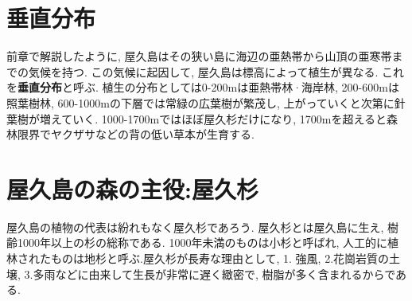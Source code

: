 \documentclass[10pt,titlepage,a5paper]{ltjsbook}
\begin{document}
\section{垂直分布}
  前章で解説したように, 屋久島はその狭い島に海辺の亜熱帯から山頂の亜寒帯までの気候を持つ. この気候に起因して, 屋久島は標高によって植生が異なる. これを\textbf{垂直分布}\footnotemark[6] と呼ぶ.
  植生の分布としては0-200mは亜熱帯林·海岸林, 200-600mは照葉樹林, 600-1000mの下層では常緑の広葉樹が繁茂し, 上がっていくと次第に針葉樹が増えていく. 1000-1700mではほぼ屋久杉だけになり, 1700mを超えると森林限界でヤクザサなどの背の低い草本が生育する. 
\section{屋久島の森の主役:屋久杉}
  屋久島の植物の代表は紛れもなく屋久杉であろう. 屋久杉とは屋久島に生え, 樹齢1000年以上の杉の総称である. 1000年未満のものは小杉と呼ばれ, 人工的に植林されたものは地杉と呼ぶ.屋久杉が長寿な理由として, 1. 強風, 2.花崗岩質の土壌, 3.多雨などに由来して生長が非常に遅く緻密で, 樹脂が多く含まれるからである. \\
\end{document}

